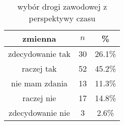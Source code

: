 \begin{table}[H]
\caption{wybór drogi zawodowej z perspektywy czasu}
\centering
\begin{tabular}{ | c | c | c |}
\hline
zmienna & $n$ & \% \\
\hline
zdecydowanie tak  &  30  & 26.1\% \\
\hline
raczej tak  &  52  & 45.2\% \\
\hline
nie mam zdania  &  13  & 11.3\% \\
\hline
raczej nie  &  17  & 14.8\% \\
\hline
zdecydowanie nie  &  3  & 2.6\% \\
\hline
\end{tabular}
\label{tab:Q36}
\end{table}
